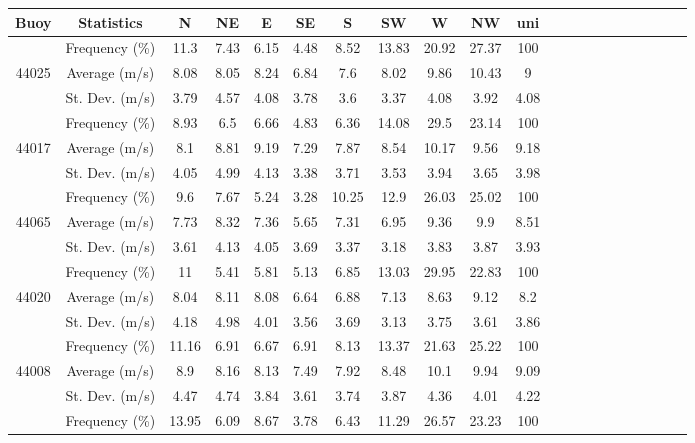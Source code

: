 \begin{table}[H]
\begin{tabular*}{\textwidth}{c@{\hskip 0.07in}cccccccccc @{\extracolsep{\fill}} cccccccccc}
\toprule
    \textbf{Buoy} & \textbf{Statistics} &  \textbf{N} & \textbf{NE}  & \textbf{E} & \textbf{SE} &  \textbf{S} &  \textbf{SW}  &  \textbf{W}  &  \textbf{NW}  & \textbf{uni}  \\ \midrule
    ~     & Frequency (\%)  & 11.3  & 7.43 & 6.15 & 4.48 & 8.52  & 13.83 & 20.92 & 27.37 & 100  \\
    44025 & Average (m/s)   & 8.08  & 8.05 & 8.24 & 6.84 & 7.6   & 8.02  & 9.86  & 10.43 & 9    \\
    ~     & St. Dev. (m/s)  & 3.79  & 4.57 & 4.08 & 3.78 & 3.6   & 3.37  & 4.08  & 3.92  & 4.08 \\ \midrule
    ~     & Frequency (\%)  & 8.93  & 6.5  & 6.66 & 4.83 & 6.36  & 14.08 & 29.5  & 23.14 & 100  \\
    44017 & Average (m/s)   & 8.1   & 8.81 & 9.19 & 7.29 & 7.87  & 8.54  & 10.17 & 9.56  & 9.18 \\
    ~     & St. Dev. (m/s)  & 4.05  & 4.99 & 4.13 & 3.38 & 3.71  & 3.53  & 3.94  & 3.65  & 3.98 \\ \midrule
    ~     & Frequency (\%)  & 9.6   & 7.67 & 5.24 & 3.28 & 10.25 & 12.9  & 26.03 & 25.02 & 100  \\
    44065 & Average (m/s)   & 7.73  & 8.32 & 7.36 & 5.65 & 7.31  & 6.95  & 9.36  & 9.9   & 8.51 \\
    ~     & St. Dev. (m/s)  & 3.61  & 4.13 & 4.05 & 3.69 & 3.37  & 3.18  & 3.83  & 3.87  & 3.93 \\ \midrule
    ~     & Frequency (\%)  & 11    & 5.41 & 5.81 & 5.13 & 6.85  & 13.03 & 29.95 & 22.83 & 100  \\
    44020 & Average (m/s)   & 8.04  & 8.11 & 8.08 & 6.64 & 6.88  & 7.13  & 8.63  & 9.12  & 8.2  \\
    ~     & St. Dev. (m/s)  & 4.18  & 4.98 & 4.01 & 3.56 & 3.69  & 3.13  & 3.75  & 3.61  & 3.86 \\ \midrule
    ~     & Frequency (\%)  & 11.16 & 6.91 & 6.67 & 6.91 & 8.13  & 13.37 & 21.63 & 25.22 & 100  \\
    44008 & Average (m/s)   & 8.9   & 8.16 & 8.13 & 7.49 & 7.92  & 8.48  & 10.1  & 9.94  & 9.09 \\
    ~     & St. Dev. (m/s)  & 4.47  & 4.74 & 3.84 & 3.61 & 3.74  & 3.87  & 4.36  & 4.01  & 4.22 \\ \midrule
    ~     & Frequency (\%)  & 13.95 & 6.09 & 8.67 & 3.78 & 6.43  & 11.29 & 26.57 & 23.23 & 100  \\

\end{tabular*}
\end{table}
